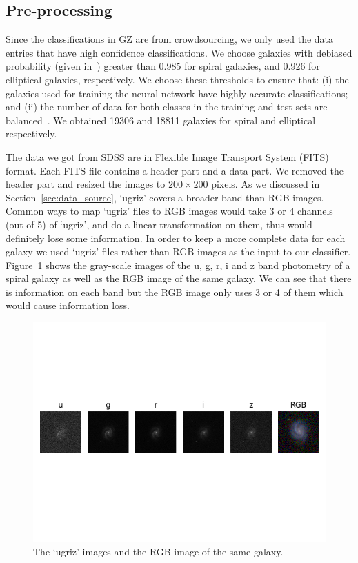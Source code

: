 \subsection{Pre-processing}
Since the classifications in GZ are from crowdsourcing, we only used the data entries that
have high confidence classifications. We choose galaxies with debiased probability (given in~\cite{lintott2010galaxy}) greater than 0.985 for spiral galaxies, and 0.926 for elliptical galaxies, respectively. 
We choose these thresholds to ensure that: (i) the galaxies used for training the neural network have highly accurate classifications; and (ii) the number of data for both classes in the training and test sets are balanced~\cite{khan2019deep}. We obtained 19306 and 18811 galaxies for spiral and elliptical respectively. 

The data we got from SDSS are in Flexible Image Transport System (FITS) format. 
Each FITS file contains a header part and a data part. We removed the header part and resized the images to $200 \times 200$ pixels. As we discussed in Section~\ref{sec:data_source}, `ugriz' covers a broader band than RGB images. Common ways to map `ugriz' files to RGB images would take 3 or 4 channels (out of 5) of `ugriz', and do a linear transformation on them, thus would definitely lose some information. 
In order to keep a more complete data for each galaxy we used `ugriz' files rather than RGB images as the input to our classifier. Figure~\ref{fig:ugriz} shows the gray-scale images of the u, g, r, i and z band photometry of a spiral galaxy as well as the RGB image of the same galaxy. We can see that there is information on each band but the RGB image only uses 3 or 4 of them which would cause information loss.

\begin{figure}[h]
	\centering
	\captionsetup{justification=centering}
	\includegraphics[trim={0 4cm 0 4cm},clip]{Figures/ugriz_vs_rgb.png}
	\caption{The `ugriz' images and the RGB image of the same galaxy.}
	\label{fig:ugriz}
\end{figure}

